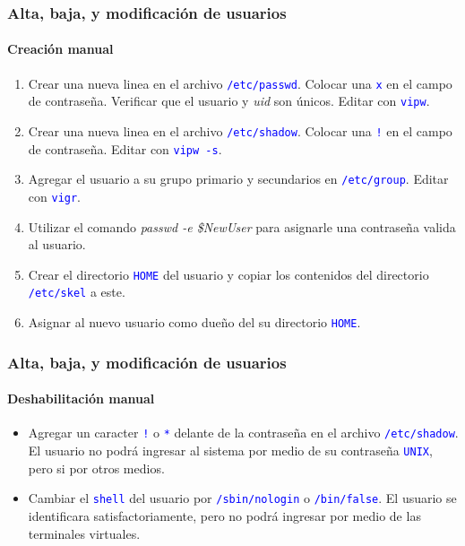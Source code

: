 \documentclass[11pt,a4paper,spanish]{beamer}
\newcommand{\codeword}[1]{\mbox{\texttt{\textcolor{blue}{#1}}}}
\begin{document}
\begin{frame}

    \frametitle{Alta, baja, y modificación de usuarios}
    \framesubtitle{Creación manual}

    \begin{enumerate}
        \item Crear una nueva linea en el archivo \codeword{/etc/passwd}.
            Colocar una \codeword{x} en el campo de contraseña. Verificar que
            el usuario y \emph{uid} son únicos. Editar con \codeword{vipw}.
        \item Crear una nueva linea en el archivo \codeword{/etc/shadow}.
            Colocar una \codeword{!} en el campo de contraseña. Editar con
            \codeword{vipw -s}.
        \item Agregar el usuario a su grupo primario y secundarios en
            \codeword{/etc/group}. Editar con \codeword{vigr}.
        \item Utilizar el comando \emph{passwd -e \$NewUser} para asignarle
            una contraseña valida al usuario.
        \item Crear el directorio \codeword{HOME} del usuario y copiar los
            contenidos del directorio \codeword{/etc/skel} a este.
        \item Asignar al nuevo usuario como dueño del su directorio
            \codeword{HOME}.
    \end{enumerate}

\end{frame}

\begin{frame}

    \frametitle{Alta, baja, y modificación de usuarios}
    \framesubtitle{Deshabilitación manual}

    \begin{itemize}
        \item Agregar un caracter \codeword{!} o \codeword{*} delante de la
            contraseña en el archivo \codeword{/etc/shadow}. El usuario no
            podrá ingresar al sistema por medio de su contraseña
            \codeword{UNIX}, pero si por otros medios.
        \item Cambiar el \codeword{shell} del usuario por
            \codeword{/sbin/nologin} o \codeword{/bin/false}. El usuario se
            identificara satisfactoriamente, pero no podrá ingresar por medio
            de las terminales virtuales.
    \end{itemize}

\end{frame}
\end{document}
